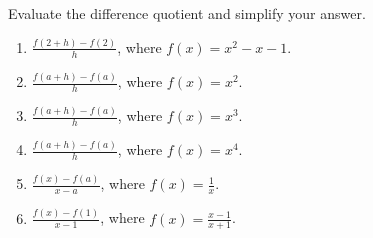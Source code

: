 Evaluate the difference quotient and simplify your answer. 
\begin{multicols}{2}
\begin{enumerate}[ref={\fcProblemRef}]
\item $\displaystyle \frac{f(2+h)-f(2)}{h}$, where $f(x)=x^2-x-1$.

\item $\displaystyle \frac{f(a+h)-f(a)}{h}$, where $f(x)= x^2$.

\item $\displaystyle \frac{f(a+h)-f(a)}{h}$, where $f(x)= x^3$.

\item $\displaystyle \frac{f(a+h)-f(a)}{h}$, where $f(x)= x^4$.

\item $\displaystyle \frac{f(x)-f(a)}{x-a}$, where $f(x)=\frac{1}{x}$.

\item $\displaystyle \frac{f(x)-f(1)}{x-1}$, where $f(x)=\frac{x-1}{x+1}$.

\end{enumerate}
\end{multicols}
